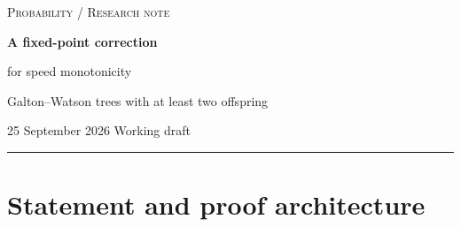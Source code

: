 \documentclass[11pt,a4paper]{article}
\numberwithin{equation}{section}
\theoremstyle{notethm}
\theoremstyle{definition}
\begin{document}
\thispagestyle{firstpage}
\begin{flushleft}
{\small\scshape\color{muted}Probability \quad / \quad Research note}\par
\vspace{0.6em}
{\fontsize{22}{26}\selectfont\bfseries A fixed-point correction\par
for speed monotonicity}\par
\vspace{0.5em}
{\large Galton--Watson trees with at least two offspring}\par
\vspace{0.7em}
{\small\color{muted}25 September 2026 \quad\textperiodcentered\quad Working draft}
\end{flushleft}
\vspace{-.3em}
\noindent\rule{\textwidth}{0.4pt}
\vspace{.2em}

\begin{abstract}
We record an argument for strict monotonicity of the speed of a biased random
walk on a Galton--Watson tree whose offspring distribution has finite mean and
is supported on $\{2,3,\ldots\}$. The main step is an inverse-square reweighting
inequality for the escape-probability fixed point. The factor two comes from
retaining the two-child structure under reweighting, rather than from a lower
bound on the escape probability. A symmetric speed formula then suggests an
explicit correction that vanishes on every fixed point. This correction makes
the distributional variation positive and the explicit parameter variation
negative. Comparing nearby fixed points yields a strictly negative upper
right Dini derivative throughout $1<\lambda<m$, without differentiating the
infinite-depth escape probability. A known low-parameter theorem completes the
monotonicity statement. Classical differentiability is invoked separately,
under an exponential-moment assumption.
\end{abstract}


\section{Statement and proof architecture}\label{sec:statement}
\end{document}
